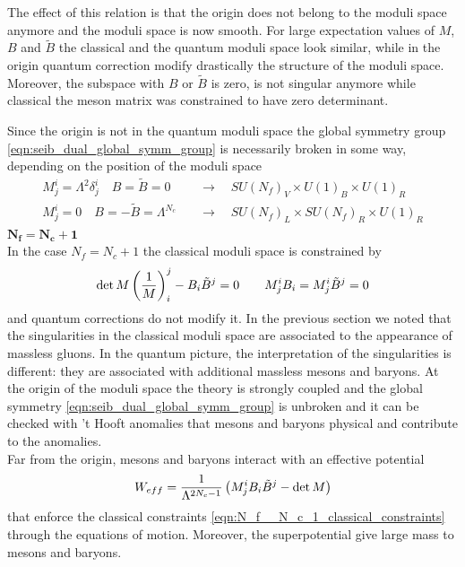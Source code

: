 The effect of this relation is that the origin  does not belong to the moduli space anymore and the moduli space is now smooth.
For large expectation values of $M$, $B$ and $\tilde{B}$ the classical and the quantum moduli space look similar, while in the origin quantum correction modify drastically the structure of the moduli space.
Moreover, the subspace with $B$ or $\tilde{B}$ is zero, is not singular anymore while classical the meson matrix was constrained to have zero determinant. 

Since the origin is not in the quantum moduli space the global symmetry group \ref{eqn:seib_dual_global_symm_group} is necessarily broken in some way, depending on the position of the moduli space 
\begin{align}
M^i_j = \Lambda^2 \delta^i_j \quad B=\tilde{B}= 0 \quad & \rightarrow  \quad SU(N_f)_V \times U(1)_B \times U(1)_R\\
M^i_j = 0 \quad B=-\tilde{B}= \Lambda^{N_c} \quad & \rightarrow  \quad SU(N_f)_L \times SU(N_f)_R \times U(1)_R
\end{align}
$\mathbf{N_f = N_c +1}$
\\
In the case $N_f = N_c +1 $ the classical moduli space is constrained by
\begin{equation}
 \mathrm{det } \,{M} \left( \frac{1}{M}\right)^j_i - B_i \tilde{B}^j = 0 \qquad
 M^i_j B_i = M^i_j \tilde{B}^j = 0 
 \label{eqn:N_f__N_c_1_classical_constraints}
\end{equation}
and quantum corrections do not modify it.
In the previous section we noted that the singularities in the classical moduli space are associated to the appearance of massless gluons.
In the quantum picture, the interpretation of the singularities is different: they are associated with additional massless mesons and baryons.
At the origin of the moduli space the theory is strongly coupled and the global symmetry \ref{eqn:seib_dual_global_symm_group} is unbroken and it can be checked with 't Hooft anomalies that mesons and baryons physical and contribute to the anomalies.\\
Far from the origin, mesons and baryons interact with an effective potential 
\begin{equation}
W_{eff} = \frac{1}{\Lambda^{2 N_c -1}} \left( M^i_j B_i \tilde{B}^j - \mathrm{det } \,{M} \right)
\end{equation}
that enforce the classical constraints \ref{eqn:N_f__N_c_1_classical_constraints} through the equations of motion. Moreover, the superpotential give large mass to mesons and baryons.
\\
